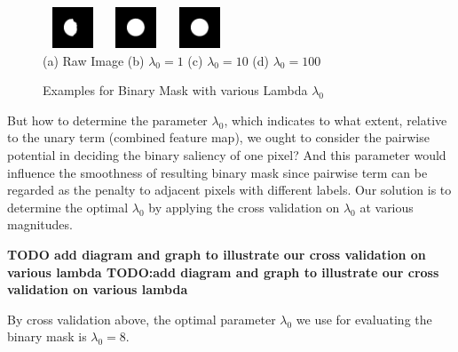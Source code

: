 \documentclass[10pt,twocolumn,letterpaper]{article}
\newcommand{\BOLD}{\textbf}
\begin{document}
\begin{figure}[h]
\begin{center}
    \includegraphics[width=0.7in,height=0.48in]{./Figures/Lambda/5_154_154732_2.jpg}
    \includegraphics[width=0.7in,height=0.48in]{./Figures/Lambda/5_154_154732_3.jpg} 
    \includegraphics[width=0.7in,height=0.48in]{./Figures/Lambda/5_154_154732_4.jpg} \\
    \footnotesize  (a) Raw Image (b) $\lambda_0 = 1$  (c) $\lambda_0 = 10$ (d) $\lambda_0 =100$ \\
     \caption{Examples for Binary Mask with various Lambda $\lambda_0$}
\end{center}
\end{figure}

But how to determine the parameter $\lambda_0$, which indicates to what extent, relative to the unary term (combined feature map), we ought to consider the pairwise potential in deciding the binary saliency of one pixel? And this parameter would influence the smoothness of resulting binary mask since pairwise term can be regarded as the penalty to adjacent pixels with different labels. Our solution is to determine the optimal $\lambda_0$ by applying the cross validation on $\lambda_0$ at various magnitudes. 

\BOLD{TODO add diagram and graph to illustrate our cross validation on various lambda
TODO:add diagram and graph to illustrate our cross validation on various lambda}

By cross validation above, the optimal parameter $\lambda_0$ we use for evaluating the binary mask is $\lambda_0 = 8$.
\end{document}
